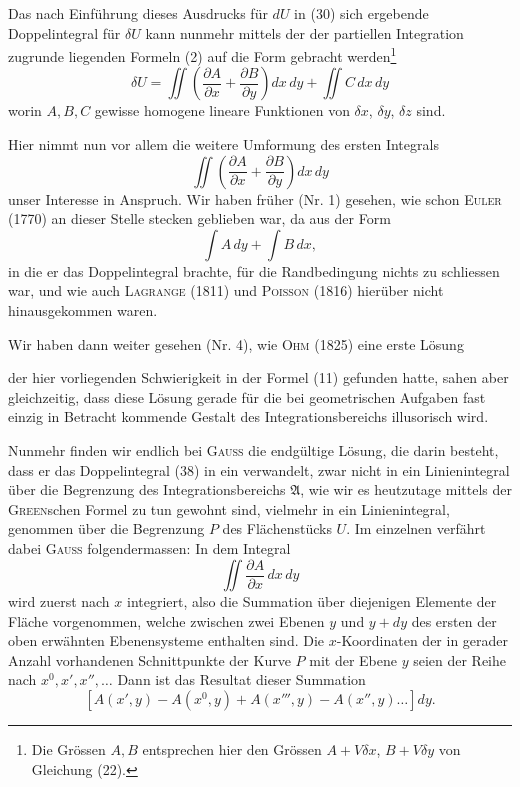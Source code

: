 Das nach Einführung dieses Ausdrucks für $dU$ in (30) sich ergebende
Doppelintegral für $\delta U$ kann nunmehr mittels der der partiellen Integration
zugrunde liegenden Formeln (2) auf die Form gebracht werden\footnote{Die Grössen $A,B$ entsprechen hier den Grössen $A+V\delta x$, $B+V\delta y$ von Gleichung (22).}
\begin{equation*}
\delta U=\iint\left(\frac{\partial A}{\partial x}+\frac{\partial B}{\partial y}\right)dx\,dy+\iint C\,dx\,dy\tag{37}
\end{equation*}
worin $A,B,C$ gewisse homogene lineare Funktionen von $\delta x$, $\delta y$, $\delta z$ sind.

Hier nimmt nun vor allem die weitere Umformung des ersten Integrals
\begin{equation*}
\iint\left(\frac{\partial A}{\partial x}+\frac{\partial B}{\partial y}\right)dx\,dy\tag{38}
\end{equation*}
unser Interesse in Anspruch. Wir haben früher (Nr. 1) gesehen, wie schon
\textsc{Euler} (1770) an dieser Stelle stecken geblieben war, da aus der Form
\[
\int A\,dy+\int B\,dx,
\]
in die er das Doppelintegral brachte, für die Randbedingung nichts zu
schliessen war, und wie auch \textsc{Lagrange} (1811) und \textsc{Poisson} (1816) hierüber
nicht hinausgekommen waren.

Wir haben dann weiter gesehen (Nr. 4), wie \textsc{Ohm} (1825) eine erste Lösung
\par\clearpage{}
\noindent der hier vorliegenden Schwierigkeit in der Formel (11) gefunden hatte, sahen
aber gleichzeitig, dass diese Lösung gerade für die bei geometrischen Aufgaben
fast einzig in Betracht kommende Gestalt des Integrationsbereichs illusorisch
wird.

Nunmehr finden wir endlich bei \textsc{Gauss} die endgültige Lösung, die darin
besteht, dass er das Doppelintegral (38) in ein  verwandelt,
zwar nicht in ein Linienintegral über die Begrenzung des Integrationsbereichs
$\mathfrak{A}$, wie wir es heutzutage mittels der \textsc{Green}schen Formel zu tun gewohnt
sind, vielmehr in ein Linienintegral, genommen über die Begrenzung $P$ des
Flächenstücks $U$. Im einzelnen verfährt dabei \textsc{Gauss} folgendermassen: In dem
Integral
\[
\iint\frac{\partial A}{\partial x}\,dx\,dy
\]
wird zuerst nach $x$ integriert, also die Summation über diejenigen Elemente
der Fläche vorgenommen, welche zwischen zwei Ebenen $y$ und $y+dy$ des
ersten der oben erwähnten Ebenensysteme enthalten sind. Die $x$-Koordinaten
der in gerader Anzahl vorhandenen Schnittpunkte der Kurve $P$ mit der Ebene
$y$ seien der Reihe nach $x^0,x',x'',\ldots$ Dann ist das Resultat dieser Summation
\[
[A(x',y)-A(x^0,y)+A(x''',y)-A(x'',y)\ldots]dy.
\]

